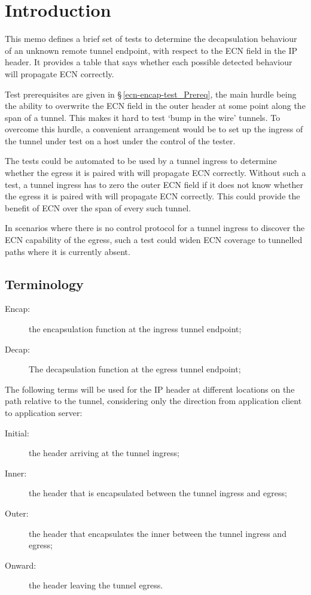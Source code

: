 \section{Introduction}\label{ecn-encap-test_Intr}

This memo defines a brief set of tests to determine the decapsulation behaviour of an unknown remote tunnel endpoint, with respect to the ECN field in the IP header. It provides a table that says whether each possible detected behaviour will propagate ECN correctly.

Test prerequisites are given in \S\,\ref{ecn-encap-test_Prereq}, the main hurdle being the ability to overwrite the ECN field in the outer header at some point along the span of a tunnel. This makes it hard to test `bump in the wire' tunnels. To overcome this hurdle, a convenient arrangement would be to set up the ingress of the tunnel under test on a host under the control of the tester. 

The tests could be automated to be used by a tunnel ingress to determine whether the egress it is paired with will propagate ECN correctly. Without such a test, a tunnel ingress has to zero the outer ECN field if it does not know whether the egress it is paired with will propagate ECN correctly. This could provide the benefit of ECN over the span of every such tunnel. 

In scenarios where there is no control protocol for a tunnel ingress to discover the ECN capability of the egress, such a test could widen ECN coverage to tunnelled paths where it is currently absent.

\subsection{Terminology}\label{ecn-encap-test_Term}

\begin{description}
	\item[Encap:] the encapsulation function at the ingress tunnel endpoint;
	\item[Decap:] The decapsulation function at the egress tunnel endpoint;
\end{description}

The following terms will be used for the IP header at different locations on the path relative to the tunnel, considering only the direction from application client to application server:
\begin{description}
	\item[Initial:] the header arriving at the tunnel ingress;
	\item[Inner:] the header that is encapsulated between the tunnel ingress and egress;
	\item[Outer:] the header that encapsulates the inner between the tunnel ingress and egress;
	\item[Onward:] the header leaving the tunnel egress.
\end{description}
